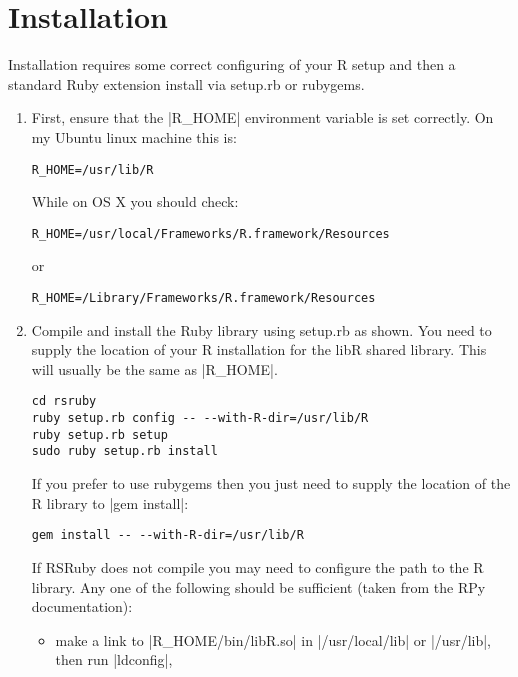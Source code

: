 \documentclass[a4paper,12pt]{book}
\begin{document}
\section{Installation}

Installation requires some correct configuring of your R setup and then a standard Ruby extension install via setup.rb or rubygems.

\begin{enumerate}

\item First, ensure that the |R_HOME| environment variable is set correctly. On my Ubuntu linux machine this is:

\begin{Verbatim}
R_HOME=/usr/lib/R
\end{Verbatim}

While on OS X you should check:

\begin{Verbatim}
R_HOME=/usr/local/Frameworks/R.framework/Resources
\end{Verbatim}

or

\begin{Verbatim}
R_HOME=/Library/Frameworks/R.framework/Resources
\end{Verbatim}

\item Compile and install the Ruby library using setup.rb as shown. You need to supply the location of your R installation for the libR shared library. This will usually be the same as |R_HOME|.

\begin{Verbatim}
cd rsruby
ruby setup.rb config -- --with-R-dir=/usr/lib/R
ruby setup.rb setup
sudo ruby setup.rb install
\end{Verbatim}

If you prefer to use rubygems then you just need to supply the location of the R library to |gem install|:

\begin{Verbatim}
gem install -- --with-R-dir=/usr/lib/R
\end{Verbatim}

If RSRuby does not compile you may need to configure the path to the R library. Any one of the following should be sufficient (taken from the RPy documentation):

\begin{itemize}

\item make a link to |R_HOME/bin/libR.so| in |/usr/local/lib| or |/usr/lib|, then run |ldconfig|,


\end{itemize}
\end{enumerate}
\end{document}
